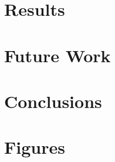 \documentclass[runningheads,a4paper]{report}
\begin{document}
	\chapter{Results}
	
	
	\chapter{Future Work} \label{sec:future-work}
	
	
	\chapter{Conclusions}
	
	
	\appendix
	\chapter{Figures}
	
		
	

	
\end{document}
